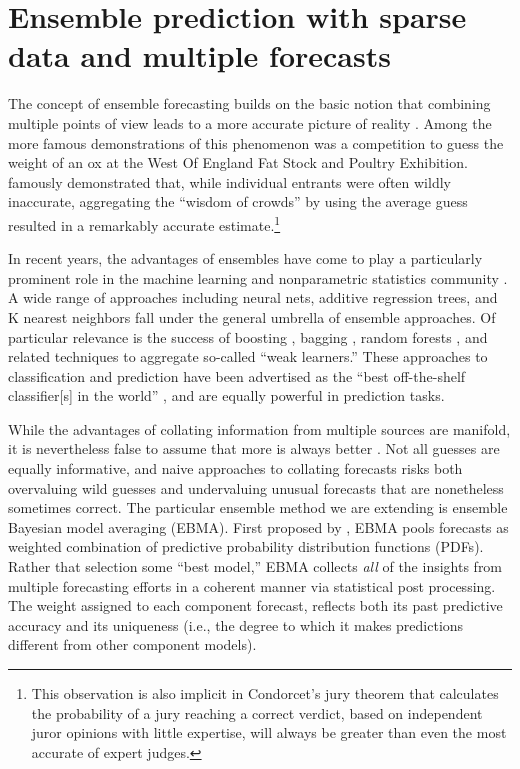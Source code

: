 \documentclass[12pt,fullpage,endnotes]{article}
\begin{document}
\section{Ensemble prediction with sparse data and multiple forecasts }
\label{theproblem}

The concept of ensemble forecasting builds on the basic notion that
combining multiple points of view leads to a more accurate picture of
reality \citep[c.f.,][]{Surowiecki:2004}.  Among the more famous
demonstrations of this phenomenon was a competition to guess the
weight of an ox at the West Of England Fat Stock and Poultry
Exhibition.  \citet{Galton:1907} famously demonstrated that, while
individual entrants were often wildly inaccurate, aggregating the
``wisdom of crowds'' by using the average guess resulted in a
remarkably accurate estimate.\footnote{This observation is also
  implicit in Condorcet's jury theorem that calculates the probability
  of a jury reaching a correct verdict, based on independent juror
  opinions with little expertise, will always be greater than even the
  most accurate of expert judges.}

In recent years, the advantages of ensembles have come to play a
particularly prominent role in the machine learning and nonparametric
statistics community \citep{Hastie:2009}. A wide range of approaches
including neural nets, additive regression trees, and K nearest
neighbors fall under the general umbrella of ensemble approaches.  Of
particular relevance is the success of boosting \citep{Freund:1997,
  Friedman:2001}, bagging \citep{Breiman:1996}, random forests
\citep{Breiman:2001}, and related techniques
\citep[e.g.,][]{Chipman:2010} to aggregate so-called ``weak
learners.''  These approaches to classification and prediction have
been advertised as the ``best off-the-shelf classifier[s] in the
world'' \citep{Breiman:1996}, and are equally powerful in prediction
tasks.

While the advantages of collating information from multiple sources
are manifold, it is nevertheless false to assume that more is always
better \citep[c.f.,][]{Page:2011}.  Not all guesses are equally
informative, and naive approaches to collating forecasts risks both
overvaluing wild guesses and undervaluing unusual forecasts that are
nonetheless sometimes correct.  The particular ensemble method we are
extending is ensemble Bayesian model averaging (EBMA). First proposed
by \citet{Raftery:2005}, EBMA pools forecasts as weighted combination
of predictive probability distribution functions (PDFs).  Rather that
selection some ``best model,'' EBMA collects \textit{all} of the
insights from multiple forecasting efforts in a coherent manner via
statistical post processing.  The weight assigned to each component
forecast, reflects both its past predictive accuracy and its
uniqueness (i.e., the degree to which it makes predictions different
from other component models).
\end{document}
